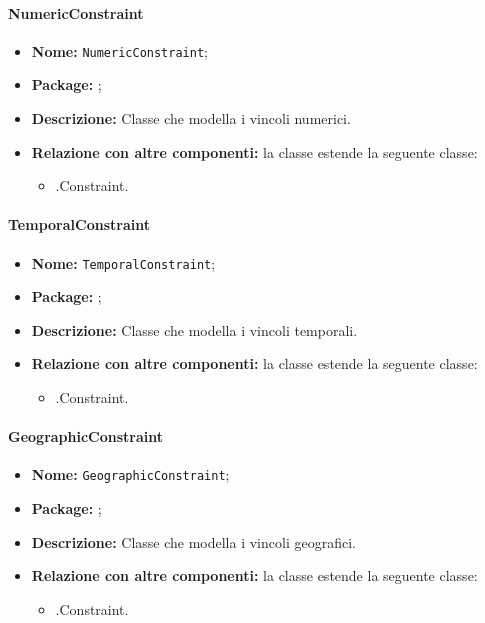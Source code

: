 \paragraph{NumericConstraint}
\begin{itemize}
\item \textbf{Nome:} \texttt{NumericConstraint};
\item \textbf{Package:} \texttt{\smodel{}};
\item \textbf{Descrizione:} Classe che modella i vincoli numerici.
\item \textbf{Relazione con altre componenti:} la classe estende la seguente classe:
		\begin{itemize}
			\item \smodel{}.Constraint.
		\end{itemize}
\end{itemize}

\paragraph{TemporalConstraint}
\begin{itemize}
\item \textbf{Nome:} \texttt{TemporalConstraint};
\item \textbf{Package:} \texttt{\smodel{}};
\item \textbf{Descrizione:} Classe che modella i vincoli temporali.
\item \textbf{Relazione con altre componenti:} la classe estende la seguente classe:
		\begin{itemize}
			\item \smodel{}.Constraint.
		\end{itemize}
\end{itemize}

\paragraph{GeographicConstraint}
\begin{itemize}
\item \textbf{Nome:} \texttt{GeographicConstraint};
\item \textbf{Package:} \texttt{\smodel{}};
\item \textbf{Descrizione:} Classe che modella i vincoli geografici.
\item \textbf{Relazione con altre componenti:} la classe estende la seguente classe:
		\begin{itemize}
			\item \smodel{}.Constraint.
		\end{itemize}
\end{itemize}

